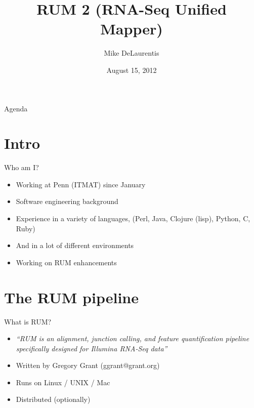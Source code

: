 \documentclass{beamer}
\title[RUM 2]{RUM 2 (RNA-Seq Unified Mapper)}
\author{Mike DeLaurentis}
\institute{University of Pennsylvania}
\date{August 15, 2012}
\begin{document}
\begin{frame}
\titlepage
\end{frame}

\begin{frame}{Agenda}
  \tableofcontents
\end{frame}

\section{Intro}

\begin{frame}{Who am I?}
  \begin{itemize}
  \item Working at Penn (ITMAT) since January
  \item Software engineering background
  \item Experience in a variety of languages, (Perl, Java, Clojure (lisp), Python, C, Ruby)
  \item And in a lot of different environments
  \item Working on RUM enhancements
  \end{itemize}
\end{frame}

\section{The RUM pipeline}

\begin{frame}{What is RUM?}
  \begin{itemize}
  \item \textit{``RUM is an alignment, junction calling, and feature quantification pipeline specifically designed for Illumina RNA-Seq data''}
  \item Written by Gregory Grant (ggrant@grant.org)
  \item Runs on Linux / UNIX / Mac
  \item Distributed (optionally)
  \end{itemize}
\end{frame}
\end{document}
